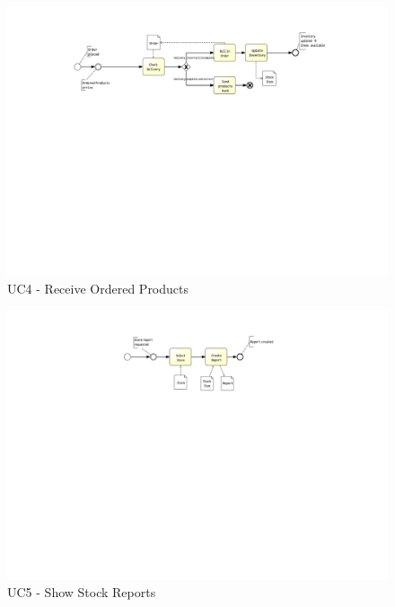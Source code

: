 \begin{figure}[h!]
	\centering
	\includegraphics[width=\textwidth, trim={6.5cm 14cm 6cm 1cm}]{img/UC4.pdf}
	\caption{UC4 - Receive Ordered Products }
	\label{fig:UC4}
\end{figure}

\pagebreak

\begin{figure}[h!]
	\centering
	\includegraphics[width=\textwidth, trim={6cm 15cm 7cm 1cm}]{img/UC5.pdf}
	\caption{UC5 - Show Stock Reports }
	\label{fig:UC5}
\end{figure}


